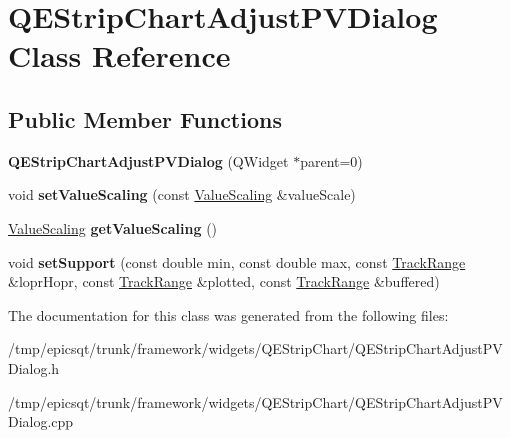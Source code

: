 \hypertarget{classQEStripChartAdjustPVDialog}{
\section{QEStripChartAdjustPVDialog Class Reference}
\label{classQEStripChartAdjustPVDialog}
}
\subsection*{Public Member Functions}
\begin{DoxyCompactItemize}
\item 
\hypertarget{classQEStripChartAdjustPVDialog_a376f84bcb212c0aefaf068bf95e5b206}{
{\bfseries QEStripChartAdjustPVDialog} (QWidget $\ast$parent=0)}
\label{classQEStripChartAdjustPVDialog_a376f84bcb212c0aefaf068bf95e5b206}

\item 
\hypertarget{classQEStripChartAdjustPVDialog_af8cad86e61f98d52014bc59576549f7a}{
void {\bfseries setValueScaling} (const \hyperlink{classValueScaling}{ValueScaling} \&valueScale)}
\label{classQEStripChartAdjustPVDialog_af8cad86e61f98d52014bc59576549f7a}

\item 
\hypertarget{classQEStripChartAdjustPVDialog_a02e7294ffb3a556f89a17785fb13aaae}{
\hyperlink{classValueScaling}{ValueScaling} {\bfseries getValueScaling} ()}
\label{classQEStripChartAdjustPVDialog_a02e7294ffb3a556f89a17785fb13aaae}

\item 
\hypertarget{classQEStripChartAdjustPVDialog_abafee9979f9023bca1b6e614f19cf6d0}{
void {\bfseries setSupport} (const double min, const double max, const \hyperlink{classTrackRange}{TrackRange} \&loprHopr, const \hyperlink{classTrackRange}{TrackRange} \&plotted, const \hyperlink{classTrackRange}{TrackRange} \&buffered)}
\label{classQEStripChartAdjustPVDialog_abafee9979f9023bca1b6e614f19cf6d0}

\end{DoxyCompactItemize}


The documentation for this class was generated from the following files:\begin{DoxyCompactItemize}
\item 
/tmp/epicsqt/trunk/framework/widgets/QEStripChart/QEStripChartAdjustPVDialog.h\item 
/tmp/epicsqt/trunk/framework/widgets/QEStripChart/QEStripChartAdjustPVDialog.cpp\end{DoxyCompactItemize}

